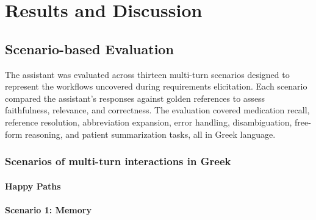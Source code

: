 
\chapter{Results and Discussion}\label{chap:results-discussion}

\ifpdf
    \graphicspath{{Chapter4/Figs/Raster/}{Chapter4/Figs/PDF/}{Chapter4/Figs/}}
\else
    \graphicspath{{Chapter4/Figs/Vector/}{Chapter4/Figs/}}
\fi

\section{Scenario-based Evaluation}
The assistant was evaluated across thirteen multi-turn scenarios designed to represent the workflows uncovered during requirements elicitation. Each scenario compared the assistant's responses against golden references to assess faithfulness, relevance, and correctness. The evaluation covered medication recall, reference resolution, abbreviation expansion, error handling, disambiguation, free-form reasoning, and patient summarization tasks, all in Greek language.

\subsection{Scenarios of multi-turn interactions in Greek}
\subsubsection{Happy Paths}

\subsubsection{Scenario 1: Memory}

